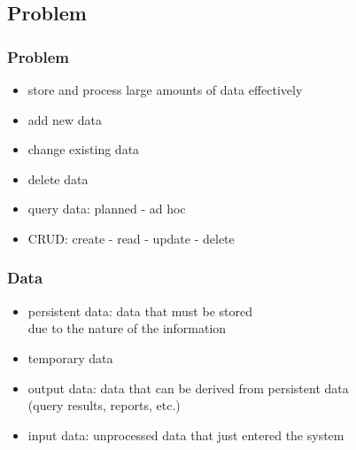 \documentclass[dvipsnames]{beamer}
\theoremstyle{plain}
\begin{document}
\subsection{Problem}

\begin{frame}
  \frametitle{Problem}

  \begin{itemize}
    \item store and process large amounts of data effectively

    \medskip
    \item add new data
    \item change existing data
    \item delete data
    \item query data: planned - ad hoc

    \pause
    \smallskip
    \item \alert{CRUD}: create - read - update - delete
  \end{itemize}
\end{frame}

\begin{frame}
  \frametitle{Data}

  \begin{itemize}
    \item \alert{persistent} data: data that must be stored\\
      due to the nature of the information

    \bigskip
    \item temporary data
    \smallskip
    \item output data: data that can be derived from persistent data\\
      (query results, reports, etc.)
    \item input data: unprocessed data that just entered the system
  \end{itemize}
\end{frame}
\end{document}
